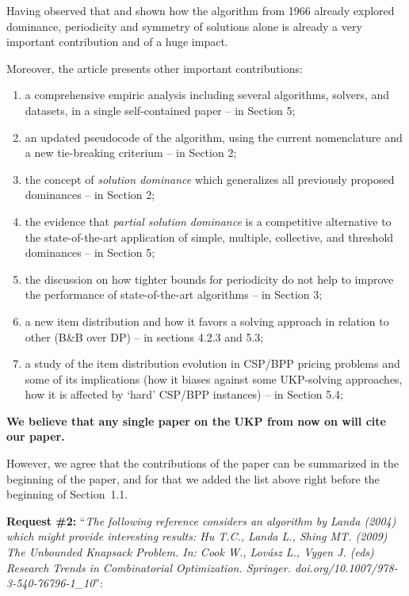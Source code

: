 \documentclass{elsarticle}
\begin{document}
Having observed that and shown how the algorithm from 1966 already explored dominance, periodicity and symmetry of solutions alone is already a very important contribution and of a huge impact.

Moreover, the article presents other important contributions:
\begin{enumerate}
\item a comprehensive empiric analysis including several algorithms, solvers, and datasets, in a single self-contained paper -- in Section 5;
\item an updated pseudocode of the algorithm, using the current nomenclature and a new tie-breaking criterium -- in Section 2;
\item the concept of \emph{solution dominance} which generalizes all previously proposed dominances -- in Section 2;
\item the evidence that \emph{partial solution dominance} is a competitive alternative to the state-of-the-art application of simple, multiple, collective, and threshold dominances -- in Section 5;
\item the discussion on how tighter bounds for periodicity do not help to improve the performance of state-of-the-art algorithms -- in Section 3;
\item a new item distribution and how it favors a solving approach in relation to other (B\&B over DP) -- in sections 4.2.3 and 5.3;
\item a study of the item distribution evolution in CSP/BPP pricing problems and some of its implications (how it biases against some UKP-solving approaches, how it is affected by `hard' CSP/BPP instances) -- in Section 5.4;
\end{enumerate}

\textbf{We believe that any single paper on the UKP from now on will cite our paper.}

However, we agree that the contributions of the paper can be summarized in the beginning of the paper, and for that we added the list above right before the beginning of Section~1.1.

\bigskip

\textbf{Request \#2:} ``\textit{The following reference considers an algorithm by Landa (2004) which might provide interesting results: Hu T.C., Landa L., Shing MT. (2009) The Unbounded Knapsack Problem. In: Cook W., Lovász L., Vygen J. (eds) Research Trends in Combinatorial Optimization. Springer. doi.org/10.1007/978-3-540-76796-1\_10}'':
\end{document}
